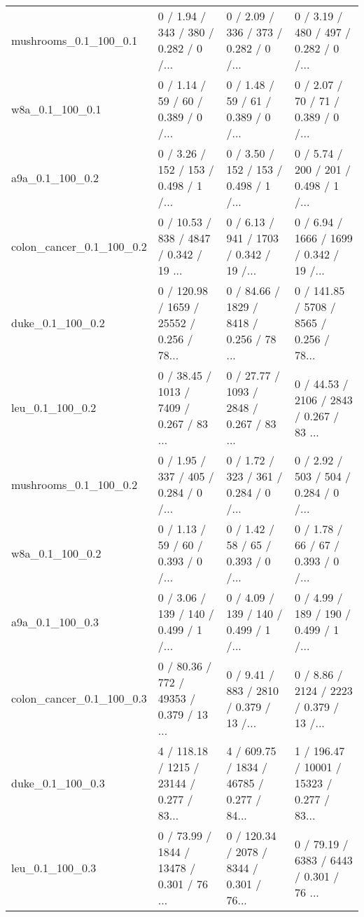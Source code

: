 \begin{tabular}{llll}
     mushrooms\_0.1\_100\_0.1 &  0 / 1.94 /    343 /     380 / 0.282 /      0 /... &  0 / 2.09 /    336 /     373 / 0.282 /      0 /... &  0 / 3.19 /    480 /     497 / 0.282 /      0 /... \\
           w8a\_0.1\_100\_0.1 &  0 / 1.14 /     59 /      60 / 0.389 /      0 /... &  0 / 1.48 /     59 /      61 / 0.389 /      0 /... &  0 / 2.07 /     70 /      71 / 0.389 /      0 /... \\
           a9a\_0.1\_100\_0.2 &  0 / 3.26 /    152 /     153 / 0.498 /      1 /... &  0 / 3.50 /    152 /     153 / 0.498 /      1 /... &  0 / 5.74 /    200 /     201 / 0.498 /      1 /... \\
  colon\_cancer\_0.1\_100\_0.2 &  0 / 10.53 /    838 /    4847 / 0.342 /     19 ... &  0 / 6.13 /    941 /    1703 / 0.342 /     19 /... &  0 / 6.94 /   1666 /    1699 / 0.342 /     19 /... \\
          duke\_0.1\_100\_0.2 &  0 / 120.98 /   1659 /   25552 / 0.256 /     78... &  0 / 84.66 /   1829 /    8418 / 0.256 /     78 ... &  0 / 141.85 /   5708 /    8565 / 0.256 /     78... \\
           leu\_0.1\_100\_0.2 &  0 / 38.45 /   1013 /    7409 / 0.267 /     83 ... &  0 / 27.77 /   1093 /    2848 / 0.267 /     83 ... &  0 / 44.53 /   2106 /    2843 / 0.267 /     83 ... \\
     mushrooms\_0.1\_100\_0.2 &  0 / 1.95 /    337 /     405 / 0.284 /      0 /... &  0 / 1.72 /    323 /     361 / 0.284 /      0 /... &  0 / 2.92 /    503 /     504 / 0.284 /      0 /... \\
           w8a\_0.1\_100\_0.2 &  0 / 1.13 /     59 /      60 / 0.393 /      0 /... &  0 / 1.42 /     58 /      65 / 0.393 /      0 /... &  0 / 1.78 /     66 /      67 / 0.393 /      0 /... \\
           a9a\_0.1\_100\_0.3 &  0 / 3.06 /    139 /     140 / 0.499 /      1 /... &  0 / 4.09 /    139 /     140 / 0.499 /      1 /... &  0 / 4.99 /    189 /     190 / 0.499 /      1 /... \\
  colon\_cancer\_0.1\_100\_0.3 &  0 / 80.36 /    772 /   49353 / 0.379 /     13 ... &  0 / 9.41 /    883 /    2810 / 0.379 /     13 /... &  0 / 8.86 /   2124 /    2223 / 0.379 /     13 /... \\
          duke\_0.1\_100\_0.3 &  4 / 118.18 /   1215 /   23144 / 0.277 /     83... &  4 / 609.75 /   1834 /   46785 / 0.277 /     84... &  1 / 196.47 /  10001 /   15323 / 0.277 /     83... \\
           leu\_0.1\_100\_0.3 &  0 / 73.99 /   1844 /   13478 / 0.301 /     76 ... &  0 / 120.34 /   2078 /    8344 / 0.301 /     76... &  0 / 79.19 /   6383 /    6443 / 0.301 /     76 ... \\

\end{tabular}
